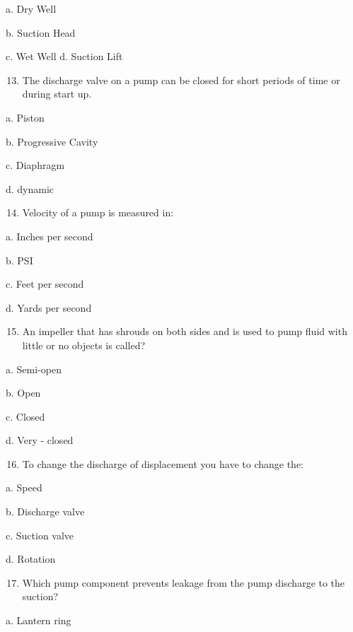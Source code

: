 \documentclass[10pt]{article}
\begin{document}
\begin{enumerate}
\begin{enumerate}
a. Dry Well

b. Suction Head

c. Wet Well d. Suction Lift

\begin{enumerate}
  \setcounter{enumi}{12}
  \item The discharge valve on a pump can be closed for short periods of time or during start up.
\end{enumerate}

a. Piston

b. Progressive Cavity

c. Diaphragm

d. dynamic

\begin{enumerate}
  \setcounter{enumi}{13}
  \item Velocity of a pump is measured in:
\end{enumerate}

a. Inches per second

b. PSI

c. Feet per second

d. Yards per second

\begin{enumerate}
  \setcounter{enumi}{14}
  \item An impeller that has shrouds on both sides and is used to pump fluid with little or no objects is called?
\end{enumerate}

a. Semi-open

b. Open

c. Closed

d. Very - closed

\begin{enumerate}
  \setcounter{enumi}{15}
  \item To change the discharge of displacement you have to change the:
\end{enumerate}

a. Speed

b. Discharge valve

c. Suction valve

d. Rotation

\begin{enumerate}
  \setcounter{enumi}{16}
  \item Which pump component prevents leakage from the pump discharge to the suction?
\end{enumerate}

a. Lantern ring


\end{enumerate}
\end{enumerate}
\end{document}
